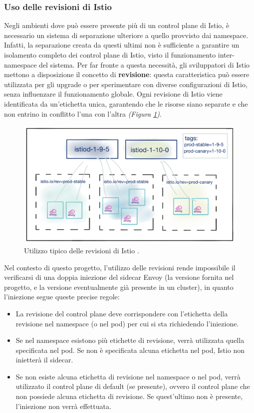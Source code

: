 \subsubsection{Uso delle revisioni di Istio}\label{subsubsect:Uso delle revisioni di Istio}
Negli ambienti dove può essere presente più di un control plane di Istio, è necessario un sistema di separazione ulteriore a quello provvisto dai namespace. Infatti, la separazione creata da questi ultimi non è sufficiente a garantire un isolamento completo dei control plane di Istio, visto il funzionamento inter-namespace del sistema. Per far fronte a questa necessità, gli sviluppatori di Istio mettono a disposizione il concetto di \textbf{revisione}: questa caratteristica può essere utilizzata per gli upgrade o per sperimentare con diverse configurazioni di Istio, senza influenzare il funzionamento globale. Ogni revisione di Istio viene identificata da un'etichetta unica, garantendo che le risorse siano separate e che non entrino in conflitto l'una con l'altra \textit{(Figura \ref{fig:revs})}.

\begin{figure}[h]
    \centering
    \includegraphics[width=\textwidth]{immagini/capitolo4/tags.png}
    \caption{Utilizzo tipico delle revisioni di Istio \cite{istio_revisions}.}
    \label{fig:revs}
\end{figure}



Nel contesto di questo progetto, l'utilizzo delle revisioni rende impossibile il verificarsi di una doppia iniezione del sidecar Envoy (la versione fornita nel progetto, e la versione eventualmente già presente in un cluster), in quanto l'iniezione segue queste precise regole:
\begin{itemize}
\item La revisione del control plane deve corrispondere con l'etichetta della revisione nel namespace (o nel pod) per cui si sta richiedendo l'iniezione.
\item Se nel namespace esistono più etichette di revisione, verrà utilizzata quella specificata nel pod. Se non è specificata alcuna etichetta nel pod, Istio non inietterà il sidecar.
\item Se non esiste alcuna etichetta di revisione nel namespace o nel pod, verrà utilizzato il control plane di default (se presente), ovvero il control plane che non possiede alcuna etichetta di revisione. Se quest'ultimo non è presente, l'iniezione non verrà effettuata.
\end{itemize}

